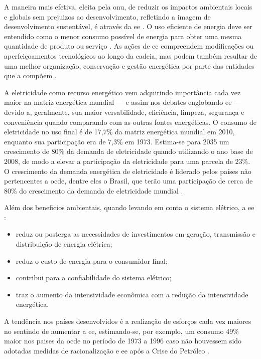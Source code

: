 A maneira mais efetiva, eleita pela \gls{onu}, de reduzir 
os impactos ambientais locais e globais sem prejuizos ao desenvolvimento, 
refletindo a imagem de desenvolvimento sustentável, é através da \gls{ee}
\cite{rippel,onu,dissert_cursino}. O uso eficiente de energia deve ser entendido como 
o menor consumo possível de energia para obter uma mesma 
quantidade de produto ou serviço \cite{pne30_eff_energ}. 
As ações de \gls{ee} compreendem modificações ou aperfeiçoamentos tecnológicos ao longo
da cadeia, mas podem também resultar de uma melhor organização, conservação e
gestão energética por parte das entidades que a compõem \cite{pnef}. 

A eletricidade como recurso energético vem adquirindo importância cada vez maior na 
matriz energética mundial --- e assim nos debates englobando \gls{ee} ---
devido a, geralmente, sua maior versabilidade, eficiência, limpeza, segurança e conveniência 
quando comparando com as outras fontes energéticas. O consumo de eletricidade no uso final é de 17,7\% 
da matriz energética mundial em 2010, enquanto sua participação era de 7,3\% em 1973. Estima-se para 2035 um
crescimento de 80\% da demanda de eletricidade quando utilizando o ano base de
2008, de modo a elevar a participação da eletricidade para uma parcela de 23\%. O crescimento da demanda energética 
de eletricidade é liderado pelos países não pertencentes a \gls{ocde}, dentre
eles o Brasil, que terão uma participação de cerca de 80\% do crescimento da demanda de
eletricidade mundial \cite{iea_weo2010}.

Além dos beneficios ambientais, quando levando em conta o sistema
elétrico, a \gls{ee} \cite{jannuzzi,epe_slides_eficiencia}: 

\begin{itemize}
\item reduz ou posterga as necessidades de investimentos em geração, transmissão 
e distribuição de energia elétrica; 
\item reduz o custo de energia para o consumidor final; 
\item contribui para a confiabilidade do sistema elétrico; 
\item traz o aumento da intensividade econômica com a redução da intensividade
energética. 
\end{itemize}

A tendência nos países desenvolvidos é a realização de esforços 
cada vez maiores no sentindo de aumentar a \gls{ee}, 
estimando-se, por exemplo, um consumo 49\% maior nos paises da \gls{ocde} 
no período de 1973 a 1996 caso não houvessem sido adotadas medidas de 
racionalização e \gls{ee} após a Crise do Petróleo
\cite{goldemberg,epe_slides_eficiencia}.

